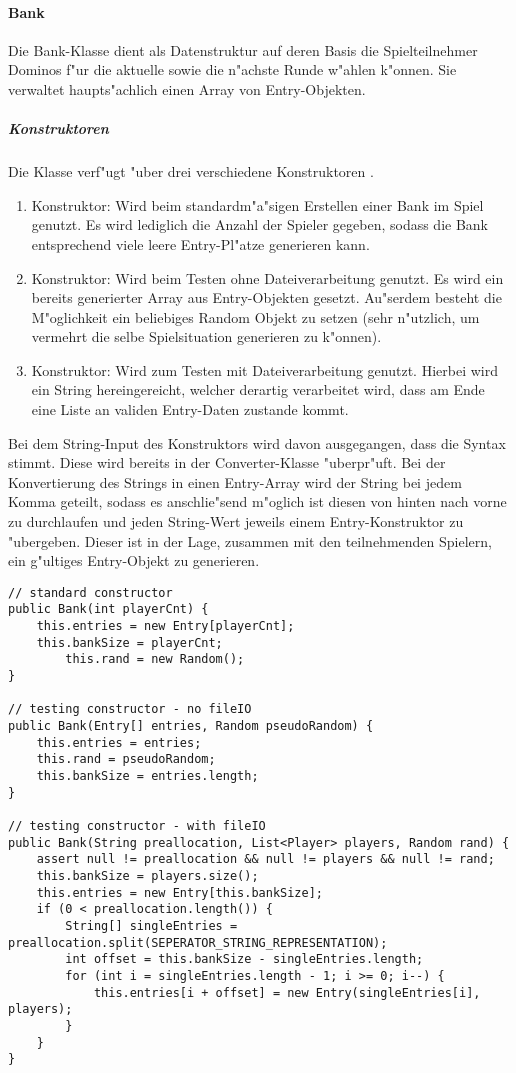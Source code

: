 \paragraph{Bank}
\label{par:bank}
Die Bank-Klasse dient als Datenstruktur auf deren Basis die Spielteilnehmer Dominos f"ur die aktuelle sowie die n"achste Runde w"ahlen k"onnen. Sie verwaltet haupts"achlich einen Array von Entry-Objekten. 

\subparagraph{Konstruktoren}
Die Klasse verf"ugt "uber drei verschiedene Konstruktoren .
\begin{enumerate}
	\item Konstruktor: Wird beim standardm"a"sigen Erstellen einer Bank im Spiel genutzt. Es wird lediglich die Anzahl der Spieler gegeben, sodass die Bank entsprechend viele leere Entry-Pl"atze generieren kann. 
	\item Konstruktor: Wird beim Testen ohne Dateiverarbeitung genutzt. Es wird ein bereits generierter Array aus Entry-Objekten gesetzt. Au"serdem besteht die M"oglichkeit ein beliebiges Random Objekt zu setzen (sehr n"utzlich, um vermehrt die selbe Spielsituation generieren zu k"onnen). 
	\item Konstruktor: Wird zum Testen mit Dateiverarbeitung genutzt. Hierbei wird ein String hereingereicht, welcher derartig verarbeitet wird, dass am Ende eine Liste an validen Entry-Daten zustande kommt. 
\end{enumerate}
Bei dem String-Input des Konstruktors wird davon ausgegangen, dass die Syntax stimmt. Diese wird bereits in der Converter-Klasse "uberpr"uft. Bei der Konvertierung des Strings in einen Entry-Array wird der String bei jedem Komma geteilt, sodass es anschlie"send m"oglich ist diesen von hinten nach vorne zu durchlaufen und jeden String-Wert jeweils einem Entry-Konstruktor zu "ubergeben. Dieser ist in der Lage, zusammen mit den teilnehmenden Spielern, ein g"ultiges Entry-Objekt zu generieren. 
\begin{lstlisting}[style=CodeHighlighting,float,caption=Bank - Konstruktor,label=lst:bank_konstruktor]
// standard constructor 
public Bank(int playerCnt) {
    this.entries = new Entry[playerCnt];
    this.bankSize = playerCnt;
        this.rand = new Random();
}

// testing constructor - no fileIO
public Bank(Entry[] entries, Random pseudoRandom) {
    this.entries = entries;
    this.rand = pseudoRandom;
    this.bankSize = entries.length;
}

// testing constructor - with fileIO
public Bank(String preallocation, List<Player> players, Random rand) {
    assert null != preallocation && null != players && null != rand;
    this.bankSize = players.size();
    this.entries = new Entry[this.bankSize];
    if (0 < preallocation.length()) {
        String[] singleEntries = preallocation.split(SEPERATOR_STRING_REPRESENTATION);
        int offset = this.bankSize - singleEntries.length;
        for (int i = singleEntries.length - 1; i >= 0; i--) {
            this.entries[i + offset] = new Entry(singleEntries[i], players);
        }
    }
}
\end{lstlisting}


